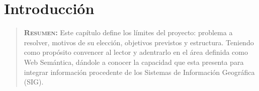 




\chapter{Introducción}
\label{ch:introduccion}

\begin{quote}
  {\bf\textsc{Resumen:}} Este capítulo define los límites del proyecto: problema a resolver, motivos de su elección, objetivos previstos y estructura. Teniendo como propósito convencer al lector y adentrarlo en el área definida como Web Semántica, dándole a conocer la capacidad que esta presenta para integrar información procedente de los Sistemas de Información Geográfica (SIG).
\end{quote}


